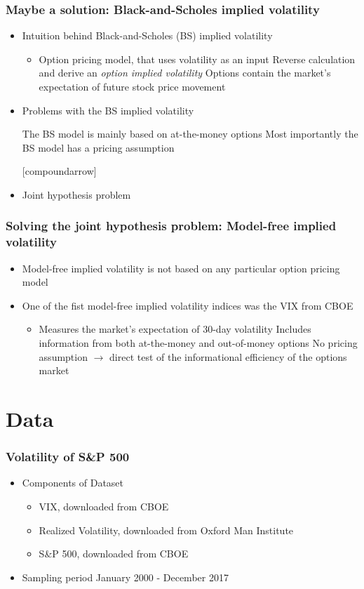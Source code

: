 \documentclass[aspectratio=169]{beamer}
\begin{document}
\begin{frame}
\frametitle{Maybe a solution: Black-and-Scholes implied volatility}
%
	\begin{itemize}
	\item<1-> Intuition behind Black-and-Scholes (BS) implied volatility
		\begin{itemize}
		\item<1-> Option pricing model, that uses volatility as an input
		\pro<1-> Reverse calculation and derive an \textit{option implied volatility}
		\pro<1-> Options contain the market's expectation of future stock price movement 
		\end{itemize}
	\item<2-> Problems with the BS implied volatility
		\begin{itemize}
		 The BS model is mainly based on at-the-money options 
		\con<2-> Most importantly the BS model has a pricing assumption
		\end{itemize}
[compoundarrow]
	\item<3-> Joint hypothesis problem
	\end{itemize}
\end{frame}

\begin{frame}
\frametitle{Solving the joint hypothesis problem: Model-free implied volatility}
	\begin{itemize}
	\item<1-> Model-free implied volatility is not based on any particular option pricing model
	\item<2-> One of the fist model-free implied volatility indices was the VIX from CBOE \parencite{exchange2009}
		\begin{itemize}
		\item<2-> Measures the market's expectation of 30-day volatility
		\pro<3-> Includes information from both at-the-money and out-of-money options
		\pro<3-> No pricing assumption $\rightarrow$ direct test of the informational efficiency of the options market
		\end{itemize}
	\end{itemize}
\end{frame}

\section{Data}

\begin{frame}
\frametitle{Volatility of S\&P 500}
	\begin{itemize}
	\item Components of Dataset
		\begin{itemize}
		\item VIX, downloaded from CBOE
		\item Realized Volatility, downloaded from Oxford Man Institute
		\item S\&P 500, downloaded from CBOE
		\end{itemize}
	\item Sampling period January 2000 - December 2017
	\end{itemize}
\end{frame}
\end{document}
